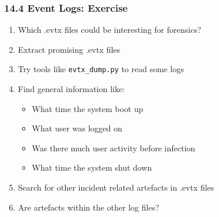 \begin{frame}[fragile]
  \frametitle{14.4 Event Logs: Exercise}
    \begin{enumerate}
        \item Which .evtx files could be interesting for forensics?
        \item Extract promising .evtx files
	\item Try tools like \texttt{evtx\_dump.py} to read some logs
        \item Find general information like:
        \begin{itemize}
            \item What time the system boot up
            \item What user was logged on
            \item Was there much user activity before infection
            \item What time the system shut down
        \end{itemize}
        \item Search for other incident related artefacts in .evtx files
        \item Are artefacts within the other log files?
    \end{enumerate}
\end{frame}





